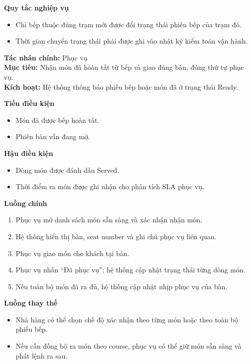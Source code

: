 \documentclass[11pt,a4paper]{article}
\begin{document}
\begin{usecasebox}[title={UC-KIT-01 --- Cập nhật tiến độ chế biến}]
    \textbf{Quy tắc nghiệp vụ}
    \begin{itemize}[leftmargin=1.8em]
  \item Chỉ bếp thuộc đúng trạm mới được đổi trạng thái phiếu bếp của trạm đó.
  \item Thời gian chuyển trạng thái phải được ghi vào nhật ký kiểm toán vận hành.
\end{itemize}
    \end{usecasebox}



    \begin{usecasebox}[title={UC-KIT-02 --- Ra món cho bàn}]
    \textbf{Tác nhân chính:} Phục vụ\\
    \textbf{Mục tiêu:} Nhận món đã hoàn tất từ bếp và giao đúng bàn, đúng thứ tự phục vụ.\\
    \textbf{Kích hoạt:} Hệ thống thông báo phiếu bếp hoặc món đã ở trạng thái \textsf{Ready}.

    \medskip
    \textbf{Tiền điều kiện}
    \begin{itemize}[leftmargin=1.8em]
  \item Món đã được bếp hoàn tất.
  \item Phiên bàn vẫn đang mở.
\end{itemize}

    \textbf{Hậu điều kiện}
    \begin{itemize}[leftmargin=1.8em]
  \item Dòng món được đánh dấu \textsf{Served}.
  \item Thời điểm ra món được ghi nhận cho phân tích SLA phục vụ.
\end{itemize}

    \textbf{Luồng chính}
    \begin{enumerate}[leftmargin=1.8em]
  \item Phục vụ mở danh sách món sẵn sàng và xác nhận nhận món.
  \item Hệ thống hiển thị bàn, seat number và ghi chú phục vụ liên quan.
  \item Phục vụ giao món cho khách tại bàn.
  \item Phục vụ nhấn \enquote{Đã phục vụ}; hệ thống cập nhật trạng thái từng dòng món.
  \item Nếu toàn bộ món đã ra đủ, hệ thống cập nhật nhịp phục vụ của bàn.
\end{enumerate}

    \textbf{Luồng thay thế}
    \begin{itemize}[leftmargin=1.8em]
  \item Nhà hàng có thể chọn chế độ xác nhận theo từng món hoặc theo toàn bộ phiếu bếp.
  \item Nếu cần đồng bộ ra món theo course, phục vụ có thể giữ món sẵn sàng và phát lệnh ra sau.
\end{itemize}


\end{usecasebox}
\end{document}

